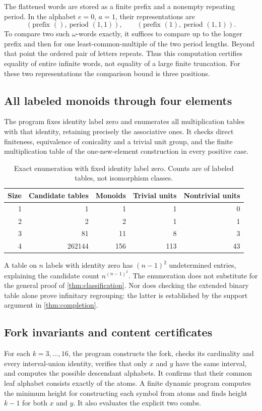 \documentclass[11pt,letterpaper]{article}
\numberwithin{equation}{section}
\theoremstyle{definition}
\theoremstyle{remark}
\begin{document}
The flattened words are stored as a finite prefix and a nonempty repeating period. In the alphabet $e=0$, $a=1$, their representations are
\[
(\text{prefix }(),\ \text{period }(1,1)),
\qquad
(\text{prefix }(1),\ \text{period }(1,1)).
\]
To compare two such $\omega$-words exactly, it suffices to compare up to the longer prefix and then for one least-common-multiple of the two period lengths. Beyond that point the ordered pair of letters repeats. Thus this computation certifies equality of entire infinite words, not equality of a large finite truncation. For these two representations the comparison bound is three positions.

\subsection{All labeled monoids through four elements}
The program fixes identity label zero and enumerates all multiplication tables with that identity, retaining precisely the associative ones. It checks direct finiteness, equivalence of conicality and a trivial unit group, and the finite multiplication table of the one-new-element construction in every positive case.

\begin{table}[htbp]
\centering
\renewcommand{\arraystretch}{1.15}
\begin{tabular}{@{}rrrrr@{}}
\toprule
Size & Candidate tables & Monoids & Trivial units & Nontrivial units\\
\midrule
1 & 1 & 1 & 1 & 0\\
2 & 2 & 2 & 1 & 1\\
3 & 81 & 11 & 8 & 3\\
4 & 262144 & 156 & 113 & 43\\
\bottomrule
\end{tabular}
\caption{Exact enumeration with fixed identity label zero. Counts are of labeled tables, not isomorphism classes.}
\label{tab:monoids}
\end{table}

A table on $n$ labels with identity zero has $(n-1)^2$ undetermined entries, explaining the candidate count $n^{(n-1)^2}$. The enumeration does not substitute for the general proof of \cref{thm:classification}. Nor does checking the extended binary table alone prove infinitary regrouping: the latter is established by the support argument in \cref{thm:completion}.

\subsection{Fork invariants and content certificates}
For each $k=3,\ldots,16$, the program constructs the fork, checks its cardinality and every interval-union identity, verifies that only $x$ and $y$ have the same interval, and computes the possible descendant alphabets. It confirms that their common leaf alphabet consists exactly of the atoms. A finite dynamic program computes the minimum height for constructing each symbol from atoms and finds height $k-1$ for both $x$ and $y$. It also evaluates the explicit two combs.
\end{document}
